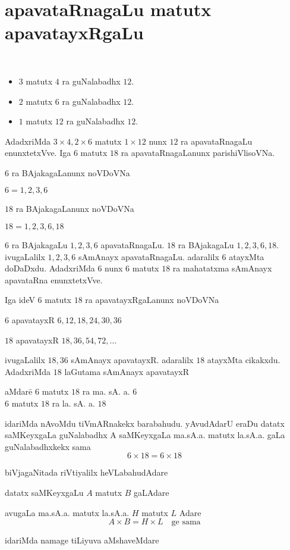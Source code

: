 \chapter{apavataRnagaLu matutx apavatayxRgaLu}
\vskip -2cm
~

\begin{itemize}
\itemsep=0pt
\item[{\rm }] $3$ matutx $4$ ra guNalabadhx $12$.
\item[{\rm }]$2$ matutx $6$ ra guNalabadhx $12$.
\item[{\rm }]$1$ matutx $12$ ra guNalabadhx $12$.
\end{itemize}
AdadxriMda $3\times4, 2\times 6 $ matutx $1\times 12$ nunx $12$ ra apavataRnagaLu enunxtetxVve. Iga $6$ matutx $18$ ra apavataRnagaLanunx parishiVlisoVNa. 

$6$ ra BAjakagaLanunx noVDoVNa

$6=1,2,3,6$ 

$18$ ra BAjakagaLanunx noVDoVNa

$18=1,2,3,6,18$

$6$ ra BAjakagaLu $1,2,3,6$ apavataRnagaLu. $18$ ra BAjakagaLu $1,2,3,6,18$. ivugaLalilx $1,2,3,6$ sAmAnayx apavataRnagaLu. adaralilx $6$ atayxMta doDaDxdu. AdadxriMda $6$ nunx $6$ matutx $18$ ra mahatatxma sAmAnayx apavataRna enunxtetxVve. 

Iga ideV $6$ matutx $18$ ra apavatayxRgaLanunx noVDoVNa 

$6$ apavatayxR $6,12,18,24,30,36$

$18$ apavatayxR $18,36,54,72,\ldots$

ivugaLalilx $18, 36$ sAmAnayx apavatayxR. adaralilx $18$ atayxMta cikakxdu. AdadxriMda $18$ laGutama sAmAnayx apavatayxR
\begin{tabbing}
aMdare\qquad \= $6$ matutx $18$ ra ma. sA. a. $6$\\
\> $6$ matutx $18$ ra la. sA. a. $18$
\end{tabbing}
idariMda nAvoMdu tiVmARnakekx barabahudu. yAvudAdarU eraDu datatx saMKeyxgaLa guNalabadhx A saMKeyxgaLa ma.sA.a. matutx la.sA.a. gaLa guNalabadhxkekx sama
$$
6\times 18 = 6 \times 18
$$

biVjagaNitada riVtiyalilx heVLabahudAdare

datatx saMKeyxgaLu $A$ matutx $B$ gaLAdare

avugaLa ma.sA.a. matutx la.sA.a.  $H$ matutx $L$ Adare
$$
A\times B = H\times L \quad \text{ge sama}
$$

idariMda namage tiLiyuva aMshaveMdare

